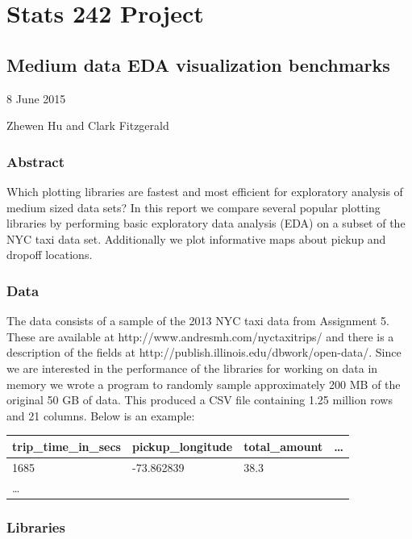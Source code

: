 \documentclass[]{article}
\date{}
\begin{document}
\section{Stats 242 Project}\label{stats-242-project}

\subsection{Medium data EDA visualization
benchmarks}\label{medium-data-eda-visualization-benchmarks}

8 June 2015

Zhewen Hu and Clark Fitzgerald

\subsubsection{Abstract}\label{abstract}

Which plotting libraries are fastest and most efficient for exploratory
analysis of medium sized data sets? In this report we compare several
popular plotting libraries by performing basic exploratory data analysis
(EDA) on a subset of the NYC taxi data set. Additionally we plot
informative maps about pickup and dropoff locations.

\subsubsection{Data}\label{data}

The data consists of a sample of the 2013 NYC taxi data from Assignment
5. These are available at http://www.andresmh.com/nyctaxitrips/ and
there is a description of the fields at
http://publish.illinois.edu/dbwork/open-data/. Since we are interested
in the performance of the libraries for working on data in memory we
wrote a program to randomly sample approximately 200 MB of the original
50 GB of data. This produced a CSV file containing 1.25 million rows and
21 columns. Below is an example:

\begin{longtable}[c]{@{}llll@{}}
\toprule
trip\_time\_in\_secs & pickup\_longitude & total\_amount &
\ldots{}\tabularnewline
\midrule
\endhead
1685 & -73.862839 & 38.3 &\tabularnewline
\ldots{} & & &\tabularnewline
\bottomrule
\end{longtable}

\subsubsection{Libraries}\label{libraries}
\end{document}
